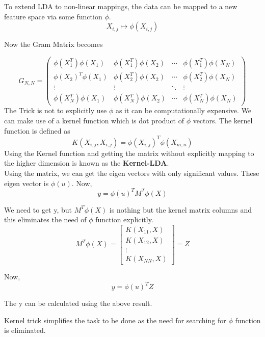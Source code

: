 \documentclass[12pt, letterpaper]{article}
\begin{document}
To extend LDA to non-linear mappings, the data can be mapped to a new feature space via some function \(\phi\).
\[X_{i,j} \longmapsto \phi(X_{i,j})\]

Now the Gram Matrix becomes

\[G_{N,N} = 
 \begin{pmatrix}
\phi(X_1^T)\phi(X_1) & \phi(X_1^T)\phi(X_2) & \cdots & \phi(X_1^T)\phi(X_N) \\
\phi(X_2)^T\phi(X_1) & \phi(X_2^T)\phi(X_2) & \cdots & \phi(X_2^T)\phi(X_N) \\
\vdots & \vdots & \ddots & \vdots\\
\phi(X_N^T)\phi(X_1) & \phi(X_N^T)\phi(X_2) & \cdots & \phi(X_N^T)\phi(X_N)
\end{pmatrix} \]
The Trick is not to explicitly use \(\phi\) as it can be computationally expensive.
We can make use of a kernel function which is dot product of \(\phi\) vectors. 
The kernel function is defined as 
\[K(X_{i,j},X_{i,j}) = \phi(X_{i,j})^T\phi(X_{m,n})\]
Using the Kernel function and getting the matrix without explicitly mapping to the higher dimension is known as the \textbf{Kernel-LDA}.\\
Using the matrix, we can get the eigen vectors with only significant values.
These eigen vector is \(\phi(u)\).
Now,
\[y=\phi(u)^T M^T \phi(X) \]

We need to get y, but \(M^T \phi(X)\) is nothing but the kernel matrix columns and this eliminates the need of \(\phi\) function explicitly.
\[M^T \phi(X) = 
\begin{bmatrix}
K(X_{11}, X) \\
K(X_{12}, X) \\
\vdots \\
K(X_{NN}, X)
\end{bmatrix} = Z\]

Now, 
\[y = \phi(u)^T Z\]

The  y can be calculated using the above result.

Kernel trick simplifies the task to be done as the need for searching for \(\phi\) function is eliminated.
\end{document}
